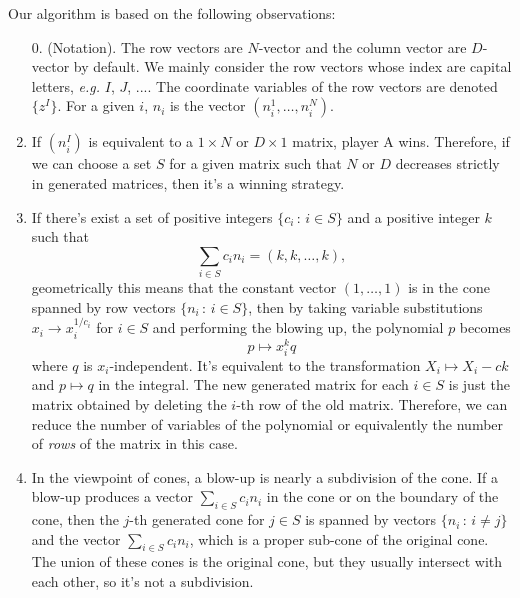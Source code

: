 \documentclass[12pt]{article}
\theoremstyle{definition}
\theoremstyle{plain}
\begin{document}
\vspace{2ex}

Our algorithm is based on the following observations:
\begin{enumerate}
	\item[0.](Notation). The row vectors are $N$-vector and the column vector are $D$-vector by default. We mainly consider the row vectors whose index are capital letters, \textit{e.g.} $I$, $J$, .... 
	The coordinate variables of the row vectors are denoted  $\{z^I\}$.
	For a given $i$, $n_i$ is the vector $(n_i^1,\dots,n_i^N)$.
	
	\item If $(n^I_i)$ is equivalent to a $1\times N$ or $D\times 1$ matrix, player A wins. 
	Therefore, if we can choose a set $S$ for a given matrix such that $N$ or $D$ 
	decreases strictly in generated matrices, then it's a winning strategy.

	\item If there's exist a set of positive integers $\{c_i\,:\,i\in S\}$ and a 
	positive integer $k$ such that
	\begin{equation}\label{linearprog}
		\sum_{i\in S} c_i n_i = (k,k,\dots,k),
	\end{equation}	
	geometrically this means that the constant vector $(1,\dots,1)$ is in the cone spanned by row vectors $\{n_i\,:\,i\in S\}$,  then by taking variable substitutions $x_{i}\to x_{i}^{1/c_{i}}$  for $i\in S$ and performing the blowing up, 
	the polynomial $p$ becomes
	\[
		p\mapsto x_i^k q
	\]
	where $q$ is $x_{i}$-independent. 
	It's equivalent to the transformation $X_i\mapsto X_i-ck$ and $p\mapsto q$ 
	in the integral. The new generated matrix for each $i\in S$ is just the matrix
	obtained by deleting the $i$-th row of the old matrix. 
	Therefore, we can reduce the number of variables of the polynomial or equivalently 
	the number of \emph{rows} of the matrix in this case.
	
	\item In the viewpoint of cones, 
	a blow-up is nearly a subdivision of the cone.
	If a blow-up produces a vector $\sum_{i\in S} c_i n_i$ in the cone 
	or on the boundary of the cone, 
	then the $j$-th generated cone for $j\in S$ is spanned by 
	vectors $\{n_i\,:\,i\neq j\}$ and the vector $\sum_{i\in S} c_i n_i$,
	which is a proper sub-cone of the original cone. 
	The union of these cones is the original cone,
	but they usually intersect with each other, so it's not a subdivision. 


\end{enumerate}
\end{document}
